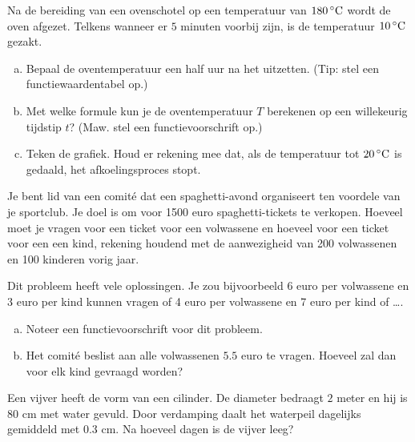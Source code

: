 \documentclass[12pt]{article}
\begin{document}
\begin{oefening}
  Na de bereiding van een ovenschotel op een temperatuur van $180\grC$ wordt de oven afgezet. Telkens wanneer er $5$ minuten voorbij zijn, is de temperatuur $10\grC$ gezakt.
  \begin{enumerate}[(a)]
  \item Bepaal de oventemperatuur een half uur na het uitzetten. (Tip: stel een functiewaardentabel op.)
  \item Met welke formule kun je de oventemperatuur $T$ berekenen op een willekeurig tijdstip $t$? (Maw. stel een functievoorschrift op.)
  \item Teken de grafiek. Houd er rekening mee dat, als de temperatuur tot $20\grC$ is gedaald, het afkoelingsproces stopt.
  \end{enumerate}
\end{oefening}

\begin{oefening}
  Je bent lid van een comité dat een spaghetti-avond organiseert ten voordele van je sportclub. Je doel is om voor 1500 euro spaghetti-tickets te verkopen. Hoeveel moet je vragen voor een ticket voor een volwassene en hoeveel voor een ticket voor een een kind, rekening houdend met de aanwezigheid van 200 volwassenen en 100 kinderen vorig jaar.

  Dit probleem heeft vele oplossingen. Je zou bijvoorbeeld 6 euro per volwassene en 3 euro per kind kunnen vragen of 4 euro per volwassene en 7 euro per kind of \ldots.
  \begin{enumerate}[(a)]
  \item Noteer een functievoorschrift voor dit probleem.
  \item Het comité beslist aan alle volwassenen $5.5$ euro te vragen. Hoeveel zal dan voor elk kind gevraagd worden?
  \end{enumerate}
\end{oefening}

\begin{oefening}
  Een vijver heeft de vorm van een cilinder. De diameter bedraagt $2$ meter en hij is $80$ cm met water gevuld. Door verdamping daalt het waterpeil dagelijks gemiddeld met $0.3$ cm. Na hoeveel dagen is de vijver leeg?
\end{oefening}
\end{document}
